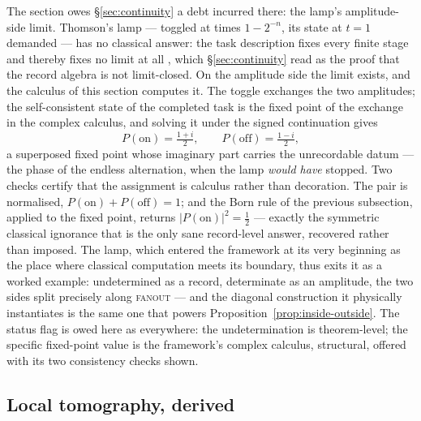 The section owes \S\ref{sec:continuity} a debt incurred there: the lamp's amplitude-side limit.
Thomson's lamp --- toggled at times $1 - 2^{-n}$, its state at $t = 1$ demanded --- has no
classical answer: the task description fixes every finite stage and thereby fixes no limit at all
\autocite{Thomson_1954,benacerraf1962tasks}, which \S\ref{sec:continuity} read as the proof that
the record algebra is not limit-closed. On the amplitude side the limit exists, and the calculus of
this section computes it. The toggle exchanges the two amplitudes; the self-consistent state of the
completed task is the fixed point of the exchange in the complex calculus, and solving it under the
signed continuation gives
\[
P(\mathrm{on}) = \tfrac{1 + i}{2}, \qquad P(\mathrm{off}) = \tfrac{1 - i}{2},
\]
a superposed fixed point whose imaginary part carries the unrecordable datum --- the phase of the
endless alternation, when the lamp \emph{would have} stopped. Two checks certify that the
assignment is calculus rather than decoration. The pair is normalised,
$P(\mathrm{on}) + P(\mathrm{off}) = 1$; and the Born rule of the previous subsection, applied to
the fixed point, returns $|P(\mathrm{on})|^{2} = \tfrac{1}{2}$ --- exactly the symmetric classical
ignorance that is the only sane record-level answer, recovered rather than imposed. The lamp,
which entered the framework at its very beginning as the place where classical computation meets
its boundary, thus exits it as a worked example: undetermined as a record, determinate as an
amplitude, the two sides split precisely along \textsc{fanout} --- and the diagonal construction it
physically instantiates \autocite{cantor1891diagonal,Turing_1937} is the same one that powers
Proposition~\ref{prop:inside-outside}. The status flag is owed here as everywhere: the
undetermination is theorem-level; the specific fixed-point value is the framework's complex
calculus, structural, offered with its two consistency checks shown.

\subsection{Local tomography, derived}\label{sec:local-tomography}

